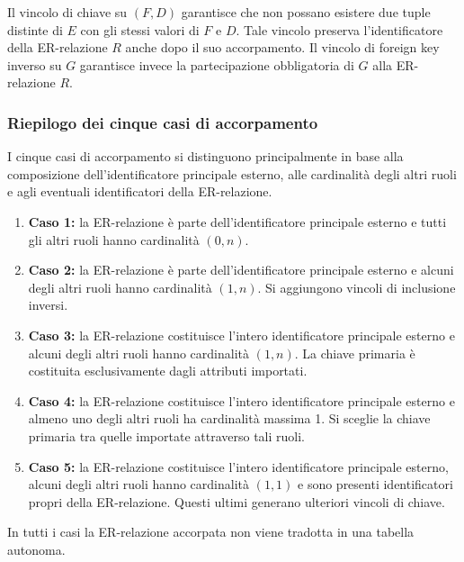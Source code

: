\noindent
Il vincolo di chiave su $(F,D)$ garantisce
che non possano esistere due tuple distinte
di $E$ con gli stessi valori di $F$ e $D$.
Tale vincolo preserva l'identificatore della
ER-relazione $R$ anche dopo il suo accorpamento.
Il vincolo di foreign key inverso su $G$
garantisce invece la partecipazione obbligatoria
di $G$ alla ER-relazione $R$.

\subsubsection{Riepilogo dei cinque casi di accorpamento}

I cinque casi di accorpamento si distinguono
principalmente in base alla composizione
dell'identificatore principale esterno,
alle cardinalità degli altri ruoli e agli
eventuali identificatori della ER-relazione.

\begin{enumerate}
    \item \textbf{Caso 1:} la ER-relazione è
    parte dell'identificatore principale
    esterno e tutti gli altri ruoli hanno
    cardinalità $(0,n)$.

    \item \textbf{Caso 2:} la ER-relazione è
    parte dell'identificatore principale
    esterno e alcuni degli altri ruoli hanno
    cardinalità $(1,n)$.
    Si aggiungono vincoli di inclusione inversi.

    \item \textbf{Caso 3:} la ER-relazione
    costituisce l'intero identificatore
    principale esterno e alcuni degli altri
    ruoli hanno cardinalità $(1,n)$.
    La chiave primaria è costituita
    esclusivamente dagli attributi importati.

    \item \textbf{Caso 4:} la ER-relazione
    costituisce l'intero identificatore
    principale esterno e almeno uno degli
    altri ruoli ha cardinalità massima 1.
    Si sceglie la chiave primaria tra quelle
    importate attraverso tali ruoli.

    \item \textbf{Caso 5:} la ER-relazione
    costituisce l'intero identificatore
    principale esterno, alcuni degli altri
    ruoli hanno cardinalità $(1,1)$ e sono
    presenti identificatori propri della
    ER-relazione.
    Questi ultimi generano ulteriori
    vincoli di chiave.
\end{enumerate}

\noindent
In tutti i casi la ER-relazione accorpata
non viene tradotta in una tabella autonoma.


